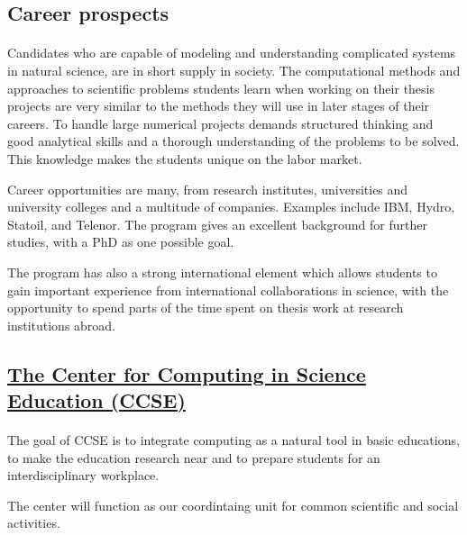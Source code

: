 \documentclass[%
oneside,                 %
final,                   %
10pt]{article}
\begin{document}
\noindent



\subsection*{Career prospects}


\paragraph{}
Candidates who are capable of modeling and understanding complicated
systems in natural science, are in short supply in society.  The
computational methods and approaches to scientific problems students learn
when working on their thesis projects are very similar to the methods
they will use in later stages of their careers.  To handle large
numerical projects demands structured thinking and good analytical
skills and a thorough understanding of the problems to be solved. This
knowledge makes the students unique on the labor market.

Career opportunities are many, from research institutes, universities
and university colleges and a multitude of companies. Examples
include IBM, Hydro, Statoil, and Telenor.  The program gives an
excellent background for further studies, with a PhD as one possible
goal.

The program has also a strong international element which allows students to
gain important experience from international collaborations in
science, with the opportunity to spend parts of the time spent on
thesis work at research institutions abroad.



\subsection*{\href{{https://www.mn.uio.no/ccse/english/}}{The Center for Computing in Science Education (CCSE)}}


\paragraph{}
The goal of CCSE is to integrate computing as a natural tool in basic educations, to make the education research near and to prepare students for an interdisciplinary workplace.

The center will function as our coordintaing unit for common scientific and social activities. 
\end{document}

